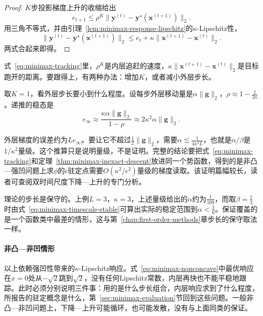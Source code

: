 \begin{proof}
$K$步投影梯度上升的收缩给出
\[
 e_{t+1}\leq\rho^K\lVert\bm{y}^{(t)}-\bm{y}^\star(\bm{x}^{(t+1)})\rVert_2.
\]
用三角不等式，并由引理~\ref{lem:minimax-response-lipschitz}的$\kappa$-Lipschitz性，
\[
 \lVert\bm{y}^{(t)}-\bm{y}^\star(\bm{x}^{(t+1)})\rVert_2\leq e_t+\kappa\lVert\bm{x}^{(t+1)}-\bm{x}^{(t)}\rVert_2.
\]
两式合起来即得。
\end{proof}

式~\eqref{eq:minimax-tracking}里，$\rho^K$是内层追赶的速度，$\kappa\lVert\bm{x}^{(t+1)}-\bm{x}^{(t)}\rVert_2$是目标跑开的距离。要跟得上，有两种办法：增加$K$，或者减小外层步长。

取$K=1$，看外层步长要小到什么程度。设每步外层移动量是$\alpha\lVert\bm{g}\rVert_2$，$\rho\approx1-\frac{1}{2\kappa}$。递推的稳态是
\[
 e_\infty\approx\frac{\kappa\alpha\lVert\bm{g}\rVert_2}{1-\rho}\approx2\kappa^2\alpha\lVert\bm{g}\rVert_2.
\]

外层梯度的误差约为$Le_\infty$。要让它不超过$\frac12\lVert\bm{g}\rVert_2$，需要$\alpha\lesssim\frac{1}{4\kappa^2L}$，也就是$\alpha/\beta$是$1/\kappa^2$量级。这个推算只是说明量级，不是证明。完整的结论要把式~\eqref{eq:minimax-tracking}和定理~\ref{thm:minimax-inexact-descent}放进同一个势函数，得到的是非凸—强凹问题上求$\phi$的$\epsilon$驻定点需要$O(\kappa^2/\epsilon^2)$量级的梯度读取。该证明篇幅较长，读者可查阅双时间尺度下降—上升的专门分析。

理论的步长是保守的。上例$L=3$，$\kappa=3$，上述量级给出的$\alpha$约为$\frac{1}{108}$，而取$\beta=\frac13$时由式~\eqref{eq:minimax-timescale-stable}可算出实际的稳定范围到$\alpha<\frac16$。保证覆盖的是一个函数类中最差的情形，这与第~\ref{chap:first-order-methods}章步长的保守取法一样。

\paragraph{非凸—非凹情形}
以上依赖强凹性带来的$\kappa$-Lipschitz响应。式~\eqref{eq:minimax-nonconcave}中最优响应在$x=0$处从$-\sqrt2$跳到$\sqrt2$，没有任何Lipschitz常数，内层再快也不能平稳地跟踪。此时必须分别说明三件事：用的是什么步长组合，内层响应求到了什么程度，所报告的驻定概念是什么，第~\ref{sec:minimax-evaluation}节回到这些问题。一般非凸—非凹问题上，下降—上升可能循环，也可能发散，没有与上面同类的保证。
